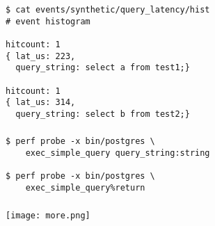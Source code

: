 \documentclass[usenames,dvipsnames, 18pt, compress, aspectratio=169]{beamer}
\begin{document}
\begin{frame}[fragile]{}
    \frametitle{}
    \begin{center}
        \begin{verbatim}
$ cat events/synthetic/query_latency/hist
# event histogram

hitcount: 1
{ lat_us: 223,
  query_string: select a from test1;}

hitcount: 1
{ lat_us: 314,
  query_string: select b from test2;}
        \end{verbatim}
    \end{center}
\end{frame}

\begin{frame}[fragile]{}
    \frametitle{}
    \begin{center}
        \begin{verbatim}
$ perf probe -x bin/postgres \
    exec_simple_query query_string:string

$ perf probe -x bin/postgres \
    exec_simple_query%return
        \end{verbatim}
    \end{center}
\end{frame}

\begin{frame}
    \frametitle{}
    \begin{center}
        \texttt{[image: more.png]}
    \end{center}
\end{frame}
\end{document}
